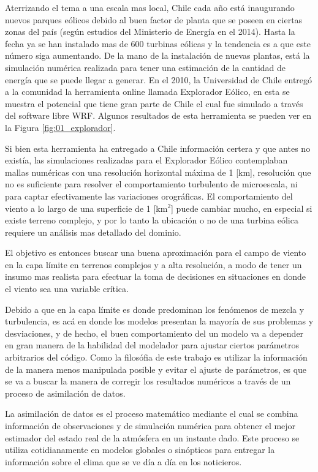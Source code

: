 Aterrizando el tema a una escala mas local, Chile cada año está inaugurando nuevos parques eólicos debido al buen factor de planta que se poseen en ciertas zonas del país (según estudios del Ministerio de Energía en el 2014). Hasta la fecha ya se han instalado mas de 600 turbinas eólicas y la tendencia es a que este número siga aumentando. De la mano de la instalación de nuevas plantas, está la simulación numérica realizada para tener una estimación de la cantidad de energía que se puede llegar a generar. En el 2010, la Universidad de Chile entregó a la comunidad la herramienta online llamada Explorador Eólico, en esta se muestra el potencial que tiene gran parte de Chile el cual fue simulado a través del software libre WRF. Algunos resultados de esta herramienta se pueden ver en la Figura \ref{fig:01_explorador}.


Si bien esta herramienta ha entregado a Chile información certera y que antes no existía, las simulaciones realizadas para el Explorador Eólico contemplaban mallas numéricas con una resolución horizontal máxima de 1 [km], resolución que no es suficiente para resolver el comportamiento turbulento de microescala, ni para captar efectivamente las variaciones orográficas. El comportamiento del viento a lo largo de una superficie de 1 [km$^2$] puede cambiar mucho, en especial si existe terreno complejo, y por lo tanto la ubicación o no de una turbina eólica requiere un análisis mas detallado del dominio.

El objetivo es entonces buscar una buena aproximación para el campo de viento en la capa límite en terrenos complejos y a alta resolución, a modo de tener un insumo mas realista para efectuar la toma de decisiones en situaciones en donde el viento sea una variable crítica.

Debido a que en la capa límite es donde predominan los fenómenos de mezcla y turbulencia, es acá en donde los modelos presentan la mayoría de sus problemas y desviaciones, y de hecho, el buen comportamiento del un modelo va a depender en gran manera de la habilidad del modelador para ajustar ciertos parámetros arbitrarios del código. Como la filosófia de este trabajo es utilizar la información de la manera menos manipulada posible y evitar el ajuste de parámetros, es que se va a buscar la manera de corregir los resultados numéricos a través de un proceso de asimilación de datos.

La asimilación de datos es el proceso matemático mediante el cual se combina información de observaciones y de simulación numérica para obtener el mejor estimador del estado real de la atmósfera en un instante dado. Este proceso se utiliza cotidianamente en modelos globales o sinópticos para entregar la información sobre el clima que se ve día a día en los noticieros.

